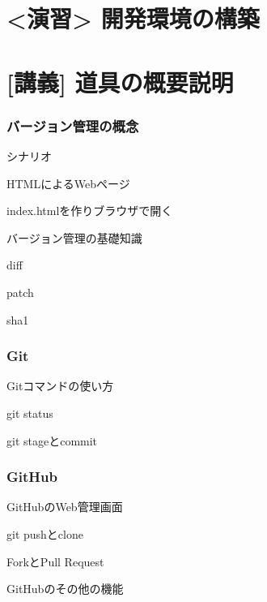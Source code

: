 \documentclass[t, aspectratio=169]{beamer}
\begin{document}
\part{<演習> 開発環境の構築}
\label{sec-5}
\part{[講義] 道具の概要説明}
\label{sec-6}
\section{バージョン管理の概念}
\label{sec-6-1}
\begin{frame}[label=sec-6-1-1]{シナリオ}
\begin{block}{HTMLによるWebページ}
\end{block}
\begin{block}{index.htmlを作りブラウザで開く}
\end{block}
\end{frame}
\begin{frame}[label=sec-6-1-2]{バージョン管理の基礎知識}
\begin{block}{diff}
\end{block}
\begin{block}{patch}
\end{block}
\begin{block}{sha1}
\end{block}
\end{frame}
\section{Git}
\label{sec-6-2}
\begin{frame}[label=sec-6-2-1]{Gitコマンドの使い方}
\end{frame}
\begin{frame}[label=sec-6-2-2]{git status}
\end{frame}
\begin{frame}[label=sec-6-2-3]{git stageとcommit}
\end{frame}
\section{GitHub}
\label{sec-6-3}
\begin{frame}[label=sec-6-3-1]{GitHubのWeb管理画面}
\end{frame}
\begin{frame}[label=sec-6-3-2]{git pushとclone}
\end{frame}
\begin{frame}[label=sec-6-3-3]{ForkとPull Request}
\end{frame}
\begin{frame}[label=sec-6-3-4]{GitHubのその他の機能}
\end{frame}
\end{document}

